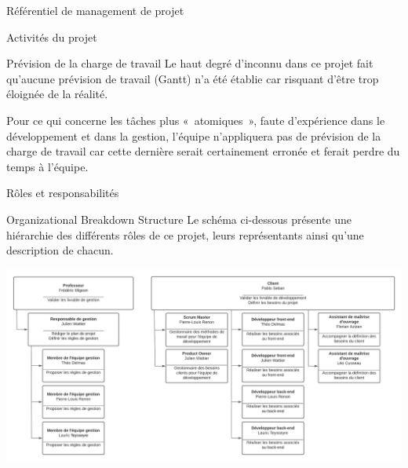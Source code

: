 \documentclass[]{article}
\begin{document}
{\begin{section}{\label{sec:Référentiel de management de projet}Référentiel de management de projet}
\begin{subsection}{\label{sec:Activités du projet}Activités du projet}
         \begin{subsubsection}{\label{sec:Prévision de la charge de travail}Prévision de la charge de travail}
             Le haut degré d’inconnu dans ce projet fait qu’aucune prévision de travail (Gantt) n’a été établie car risquant d’être trop éloignée de la réalité.

             Pour ce qui concerne les tâches plus « atomiques », faute d’expérience dans le développement et dans la gestion, l’équipe n’appliquera pas de prévision de la charge de travail car cette dernière serait certainement erronée et ferait perdre du temps à l’équipe.
         \end{subsubsection}
     \end{subsection}

\newpage

     \begin{subsection}{\label{sec:Rôles et responsabilités}Rôles et responsabilités}
         \begin{subsubsection}{\label{sec:Organizational Breakdown Structure}Organizational Breakdown Structure}
             Le schéma ci-dessous présente une hiérarchie des différents rôles de ce projet, leurs représentants ainsi qu’une description de chacun.

             \includegraphics[scale=0.32]{documents/IMG/OBS}
         \end{subsubsection}


\end{subsection}
\end{section}}
\end{document}
